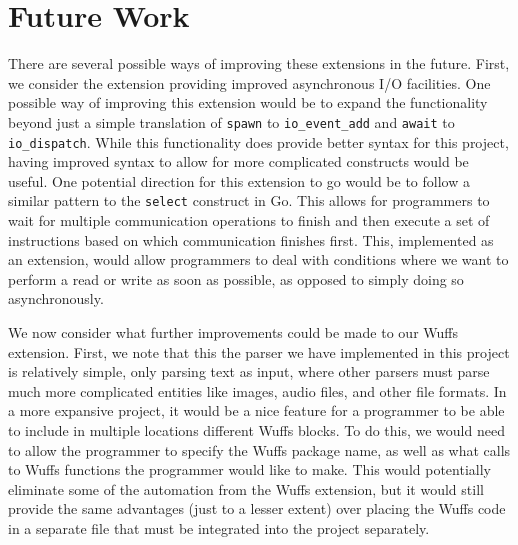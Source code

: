 \documentclass[main.tex]{subfiles}
\begin{document}
\section{Future Work}
There are several possible ways of improving these extensions in the future. First, we consider the extension
providing improved asynchronous I/O facilities. One possible way of improving this extension would be to expand
the functionality beyond just a simple translation of \verb|spawn| to \verb|io_event_add| and \verb|await| to 
\verb|io_dispatch|. While this functionality does provide better syntax for this project, having improved syntax to allow
for more complicated constructs would be useful. One potential direction for this extension to go would be to follow a
similar pattern to the \verb|select| construct in Go. This allows for programmers to wait for multiple communication
operations to finish and then execute a set of instructions based on which communication finishes first. This, 
implemented as an extension, would allow programmers to deal with conditions where we want to perform a read or
write as soon as possible, as opposed to simply doing so asynchronously.

We now consider what further improvements could be made to our Wuffs extension. First, we note that this the parser
we have implemented in this project is relatively simple, only parsing text as input, where other parsers must parse
much more complicated entities like images, audio files, and other file formats. In a more expansive project, it would be
a nice feature for a programmer to be able to include in multiple locations different Wuffs blocks. To do this, we would
need to allow the programmer to specify the Wuffs package name, as well as what calls to Wuffs functions the
programmer would like to make. This would potentially eliminate some of the automation from the Wuffs extension,
but it would still provide the same advantages (just to a lesser extent) over placing the Wuffs code in a separate file that
must be integrated into the project separately.
\end{document}
